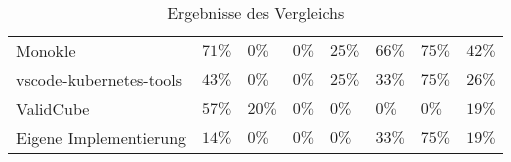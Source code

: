\begin{table}[htp]
\begin{tabular}{llllllll}
        Monokle                 & $71\%$                      & $0\%$                       & $0\%$                       & $25\%$                      & $66\%$                      & $75\%$                      & $42\%$                 \\
        vscode-kubernetes-tools & $43\%$                      & $0\%$                       & $0\%$                       & $25\%$                      & $33\%$                      & $75\%$                      & $26\%$                 \\
        ValidCube               & $57\%$                      & $20\%$                      & $0\%$                       & $0\%$                       & $0\%$                       & $0\%$                       & $19\%$                 \\
        Eigene Implementierung  & $14\%$                      & $0\%$                       & $0\%$                       & $0\%$                       & $33\%$                      & $75\%$                      & $19\%$                 \\
        \bottomrule
    \end{tabular}
    \caption{Ergebnisse des Vergleichs}
    \label{tbl:kubernetes-manifest-tools-capabilities}
\end{table}
